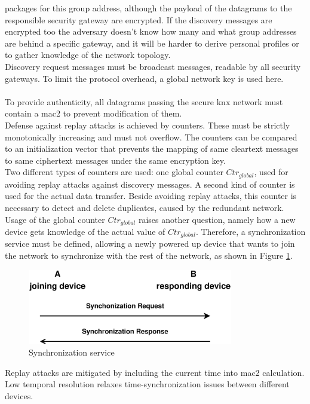 packages for this group address, although the payload of the datagrams to the responsible security gateway are encrypted.
If the discovery messages are encrypted too the adversary doesn't know how many and what
group addresses are behind a specific gateway, and it will be harder to derive personal profiles or to gather knowledge of the network topology.
\\
Discovery request messages must be broadcast messages, readable by all security gateways. To limit the protocol overhead, a global network key is used here.
\\
\\
To provide authenticity, all datagrams passing the secure \gls{knx} network must contain a \gls{mac2} to prevent modification of them.
\\
Defense against replay attacks is achieved by counters. These must be strictly monotonically
increasing and must not overflow. The counters can be compared to an initialization vector that prevents the mapping of same cleartext messages to same ciphertext messages
under the same encryption key.
\\
Two different types of counters are used: one global counter $Ctr_{global}$, used for avoiding replay attacks against discovery messages. A second kind of counter
is used for the actual data transfer. Beside avoiding replay attacks, this counter is necessary to detect and delete duplicates, caused by the redundant network. 
\\
Usage of the global counter $Ctr_{global}$ raises another question, namely how a new device gets knowledge of the actual value of $Ctr_{global}$.
Therefore, a synchronization service must be defined, allowing a newly powered up device that wants to join the network to synchronize with the rest of the network, as shown in Figure \ref{fig:syncProt}.
\begin{figure}
  \centering
    \includegraphics[width=0.8\textwidth]{figures/protSync.eps}
 \caption{Synchronization service}
 \label{fig:syncProt}
\end{figure}
Replay attacks are mitigated by including the current time into \gls{mac2} calculation. Low temporal resolution relaxes time-synchronization issues between
different devices.


